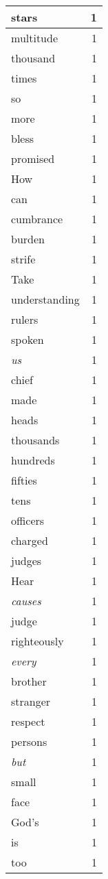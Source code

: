 \begin{center}
\begin{longtable}{l|r}
stars & 1 \\ \hline
multitude & 1 \\ \hline
thousand & 1 \\ \hline
times & 1 \\ \hline
so & 1 \\ \hline
more & 1 \\ \hline
bless & 1 \\ \hline
promised & 1 \\ \hline
How & 1 \\ \hline
can & 1 \\ \hline
cumbrance & 1 \\ \hline
burden & 1 \\ \hline
strife & 1 \\ \hline
Take & 1 \\ \hline
understanding & 1 \\ \hline
rulers & 1 \\ \hline
spoken & 1 \\ \hline
\emph{us} & 1 \\ \hline
chief & 1 \\ \hline
made & 1 \\ \hline
heads & 1 \\ \hline
thousands & 1 \\ \hline
hundreds & 1 \\ \hline
fifties & 1 \\ \hline
tens & 1 \\ \hline
officers & 1 \\ \hline
charged & 1 \\ \hline
judges & 1 \\ \hline
Hear & 1 \\ \hline
\emph{causes} & 1 \\ \hline
judge & 1 \\ \hline
righteously & 1 \\ \hline
\emph{every} & 1 \\ \hline
brother & 1 \\ \hline
stranger & 1 \\ \hline
respect & 1 \\ \hline
persons & 1 \\ \hline
\emph{but} & 1 \\ \hline
small & 1 \\ \hline
face & 1 \\ \hline
God's & 1 \\ \hline
is & 1 \\ \hline
too & 1 \\ \hline

\end{longtable}
\end{center}
